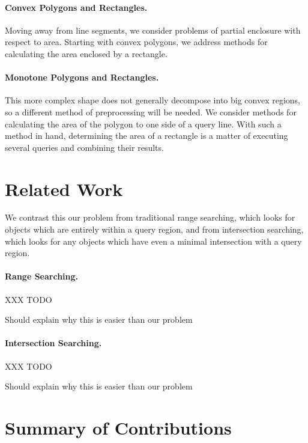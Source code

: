 \paragraph{Convex Polygons and Rectangles.} Moving away from line segments, we consider problems of partial enclosure with respect to area. 
Starting with convex polygons, we address methods for calculating the area enclosed by a rectangle. 
 
\paragraph{Monotone Polygons and Rectangles.} This more complex shape does not generally decompose into big convex regions, so a different method of preprocessing will be needed.
We consider methods for calculating the area of the polygon to one side of a query line. 
With such a method in hand, determining the area of a rectangle is a matter of executing several queries and combining their results.

\section{Related Work}
\label{:intro:related}

We contrast this our problem from traditional range searching, which looks for objects which are entirely within a query region, and from intersection searching, which looks for any objects which have even a minimal intersection with a query region.

\paragraph{Range Searching.} 
XXX TODO

Should explain why this is easier than our problem

\paragraph{Intersection Searching.} 
XXX TODO

Should explain why this is easier than our problem


\section{Summary of Contributions}
\label{:intro:contributions}

